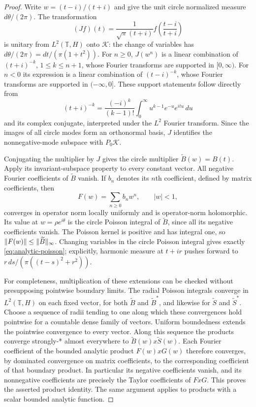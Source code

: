 \begin{proof}
Write $w=(t-i)/(t+i)$ and give the unit circle normalized measure
$d\theta/(2\pi)$.  The transformation
\[
 (Jf)(t)=\frac{1}{\sqrt\pi(t+i)}
             f\left(\frac{t-i}{t+i}\right)
\]
is unitary from $L^2(\mathbb T,H)$ onto $\mathcal K$: the change of variables
has $d\theta/(2\pi)=dt/(\pi(1+t^2))$.
For $n\geq0$, $J(w^n)$ is a linear combination of $(t+i)^{-k}$,
$1\leq k\leq n+1$, whose Fourier transforms are supported in $[0,\infty)$.
For $n<0$ its expression is a linear combination of $(t-i)^{-k}$, whose
Fourier transforms are supported in $(-\infty,0]$.  These support statements follow directly from
\[
 (t+i)^{-k}=\frac{(-i)^k}{(k-1)!}
       \int_0^\infty u^{k-1}e^{-u}e^{itu}\,du
\]
and its complex conjugate, interpreted under the $L^2$ Fourier transform.  Since the images of all circle modes form an orthonormal basis,
$J$ identifies the nonnegative-mode subspace with $P_0\mathcal K$.

Conjugating the multiplier by $J$ gives the circle multiplier
$\widetilde B(w)=B(t)$.  Apply its invariant-subspace property to every
constant vector.  All negative Fourier coefficients of $\widetilde B$ vanish.
If $b_n$ denotes its $n$th coefficient, defined by matrix coefficients, then
\[
 F(w)=\sum_{n\geq0} b_nw^n,\qquad |w|<1,
\]
converges in operator norm locally uniformly and is operator-norm
holomorphic.  Its value at $w=\rho e^{i\theta}$ is the circle Poisson
integral of $\widetilde B$, since all its negative coefficients vanish.
The Poisson kernel is positive and has integral one, so
$\lVert F(w)\rVert\leq\lVert\widetilde B\rVert_\infty$.
Changing variables in the circle Poisson integral gives exactly
\eqref{eq:analytic-poisson}; explicitly, harmonic measure at $t+ir$
pushes forward to $r\,ds/(\pi((t-s)^2+r^2))$.

For completeness, multiplication of these extensions can be checked
without presupposing pointwise boundary limits.  The radial Poisson
integrals converge in $L^2(\mathbb T,H)$ on each fixed vector, for both
$\widetilde B$ and $\widetilde B^*$, and likewise for $\widetilde S$ and
$\widetilde S^*$.  Choose a sequence of radii tending to one along which
these convergences hold pointwise for a countable dense family of vectors.
Uniform boundedness extends the pointwise convergence to every vector.
Along this sequence the products converge strongly-* almost everywhere
to $\widetilde B(w)x\widetilde S(w)$.  Each Fourier coefficient of the
bounded analytic product $F(w)xG(w)$ therefore converges, by dominated
convergence on matrix coefficients, to the corresponding coefficient of
that boundary product.  In particular its negative coefficients vanish,
and its nonnegative coefficients are precisely the Taylor coefficients
of $F xG$.  This proves the asserted product identity.  The same argument
applies to products with a scalar bounded analytic function.
\end{proof}


